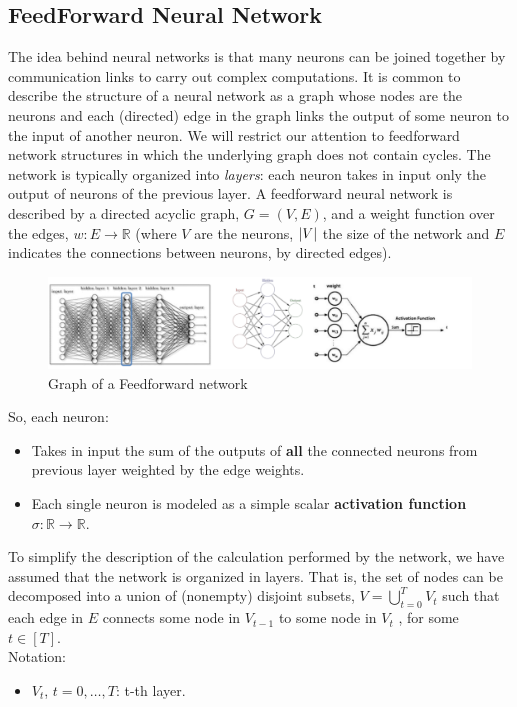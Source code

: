 \documentclass[12pt]{report}
\theoremstyle{plain}
\begin{document}
\begin{flushleft}
\section{FeedForward Neural Network}
The idea behind neural networks is that many neurons can be joined together by communication links to carry out complex computations. It is common to describe the structure of a neural network as a graph whose nodes are the neurons and each (directed) edge in the graph links the output of some neuron to the input of another neuron. We will restrict our attention to feedforward network structures in which the underlying graph does not contain cycles. The network is typically organized into \textit{layers}: each neuron takes in input only the output of neurons of the previous layer. A feedforward neural network is described by a directed acyclic graph, $G =(V, E)$, and a weight function over the edges, $w:E\to\mathds{R}$ (where $V$ are the neurons, $\abs{V}$ the size of the network and $E$ indicates the connections between neurons, by directed edges).\\
\begin{figure}[!h]
	\centering
	\includegraphics[scale=0.7]{images/feedforward_NN.pdf}
	\caption{Graph of a Feedforward network}
	\label{fig:feedforward_NN}
\end{figure}
So, each neuron:
\begin{itemize}
	\item Takes in input the sum of the outputs of \textbf{all} the connected neurons from previous layer weighted by the	edge weights.
	\item Each single neuron is modeled as a simple scalar \textbf{activation function} $\sigma : \mathds{R}\to\mathds{R}$.
\end{itemize}
To simplify the description of the calculation performed by the network, we have assumed that the network is organized in layers. That is, the set of nodes can be decomposed into a union of (nonempty) disjoint subsets, $V=\bigcup_{t=0}^T V_t$ such that each edge in $E$ connects some node in $V_{t-1}$ to some node in $V_t$ , for some $t\in[T]$.\\
Notation:
\begin{itemize}
	\item $V_t$, $t=0,\dots,T$: t-th layer.

\end{itemize}
\end{flushleft}
\end{document}
